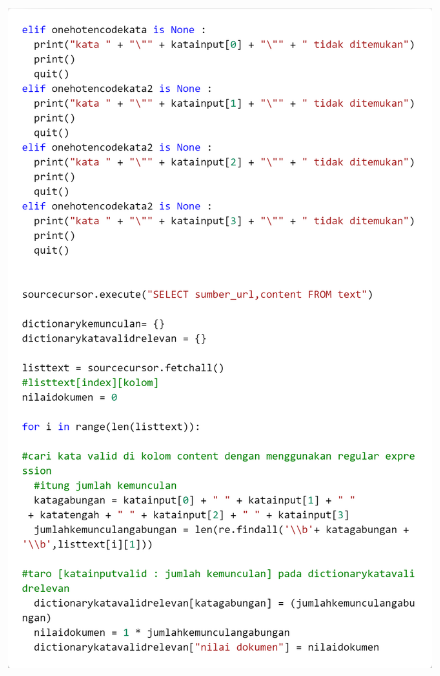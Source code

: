 \documentclass[12pt]{report}
\begin{document}
\begin{figure}[H]
\centering
\includegraphics[scale=0.3]{search4cbow3}
\end{figure}
\end{document}
